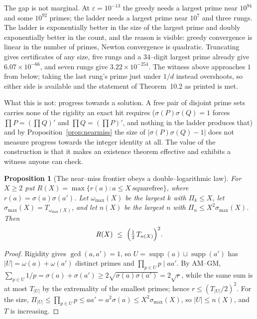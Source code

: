 \documentclass[11pt]{article}
\newtheorem{proposition}[theorem]{Proposition}
\theoremstyle{definition}
\begin{document}
The gap is not marginal. At $\varepsilon=10^{-13}$ the greedy needs a largest prime near $10^{94}$
and some $10^{92}$ primes; the ladder needs a largest prime near $10^{7}$ and three rungs. The
ladder is exponentially better in the size of the largest prime and doubly exponentially better in
the count, and the reason is visible: greedy convergence is linear in the number of primes, Newton
convergence is quadratic. Truncating gives certificates of any size, five rungs and a $34$--digit
largest prime already give $6.07\times10^{-66}$, and seven rungs give $3.22\times10^{-254}$. The witness above approaches $1$ from below; taking
the last rung's prime just under $1/d$ instead overshoots, so either side is available and the
statement of Theorem~10.2 as printed is met.

What this is not: progress towards a solution. A free pair of disjoint prime sets carries none of
the rigidity an exact hit requires ($\sigma(P)\sigma(Q)=1$ forces $\prod P=(\prod Q)'$ and
$\prod Q=(\prod P)'$, and nothing in the ladder produces that) and by
Proposition~\ref{prop:nearmiss} the size of $|\sigma(P)\sigma(Q)-1|$ does not measure progress
towards the integer identity at all. The value of the construction is that it makes an existence
theorem effective and exhibits a witness anyone can check.

\begin{proposition}[The near--miss frontier obeys a double--logarithmic law]\label{prop:frontier}
For $X\ge2$ put $R(X)=\max\{r(a):a\le X\ \text{squarefree}\}$, where $r(a)=\sigma(a)\sigma(a')$. Let
$\omega_{\max}(X)$ be the largest $k$ with $\Pi_k\le X$, let $\sigma_{\max}(X)=T_{\omega_{\max}(X)}$,
and let $n(X)$ be the largest $n$ with $\Pi_n\le X^{2}\sigma_{\max}(X)$. Then
\[ R(X)\ \le\ \Bigl(\tfrac12\,T_{n(X)}\Bigr)^{2}. \]
\end{proposition}
\begin{proof}
Rigidity gives $\gcd(a,a')=1$, so $U=\operatorname{supp}(a)\sqcup\operatorname{supp}(a')$ has
$|U|=\omega(a)+\omega(a')$ distinct primes and $\prod_{p\in U}p\mid aa'$. By AM--GM,
$\sum_{p\in U}1/p=\sigma(a)+\sigma(a')\ge2\sqrt{\sigma(a)\sigma(a')}=2\sqrt{r}$, while the same sum
is at most $T_{|U|}$ by the extremality of the smallest primes; hence $r\le(T_{|U|}/2)^{2}$. For the
size, $\Pi_{|U|}\le\prod_{p\in U}p\le aa'=a^{2}\sigma(a)\le X^{2}\sigma_{\max}(X)$, so
$|U|\le n(X)$, and $T$ is increasing.
\end{proof}
\end{document}
